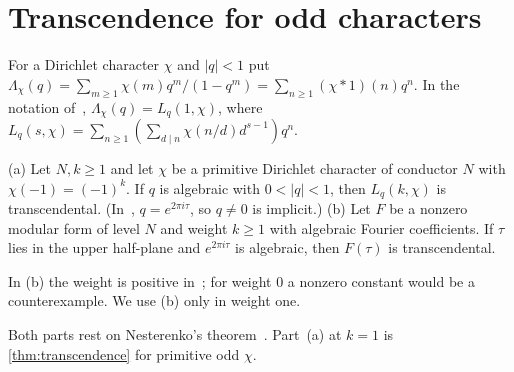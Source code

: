 \documentclass[11pt]{article}
\begin{document}
\section{Transcendence for odd characters}\label{sec:transcendence}

For a Dirichlet character $\chi$ and $|q|<1$ put
$\Lambda_\chi(q)=\sum_{m\ge1}\chi(m)q^m/(1-q^m)=\sum_{n\ge1}(\chi*1)(n)q^n$.
In the notation of~\cite{HamiehMurty2016}, $\Lambda_\chi(q)=L_q(1,\chi)$, where
$L_q(s,\chi)=\sum_{n\ge1}(\sum_{d\mid n}\chi(n/d)d^{s-1})q^n$.

\begin{theorem}\label{thm:hm}
\textup{(a)} Let $N,k\ge1$ and let $\chi$ be a primitive Dirichlet character of
conductor $N$ with $\chi(-1)=(-1)^k$. If $q$ is algebraic with $0<|q|<1$, then
$L_q(k,\chi)$ is transcendental. (In~\cite{HamiehMurty2016}, $q=e^{2\pi i\tau}$,
so $q\ne0$ is implicit.)
\textup{(b)} Let $F$ be a nonzero modular form of level $N$ and weight $k\ge1$ with
algebraic Fourier coefficients. If $\tau$ lies in the upper half-plane and
$e^{2\pi i\tau}$ is algebraic, then $F(\tau)$ is transcendental.
\end{theorem}

In (b) the weight is positive in~\cite{HamiehMurty2016}; for weight $0$ a nonzero
constant would be a counterexample. We use (b) only in weight one.

Both parts rest on Nesterenko's theorem~\cite{Nesterenko1996}. Part~(a) at $k=1$
is \cref{thm:transcendence} for primitive odd $\chi$.
\end{document}
